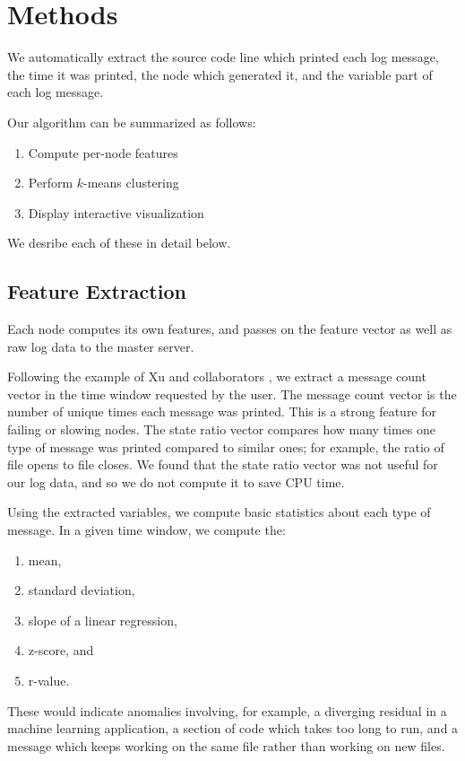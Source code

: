 \documentclass[conference]{style/acmsiggraph}
\begin{document}
\section{Methods}

We automatically extract the source code line which printed each log message, the time it was printed, the node which generated it, and the variable part of each log message.

Our algorithm can be summarized as follows:

\begin{enumerate}
    \item Compute per-node features
    \item Perform $k$-means clustering
    \item Display interactive visualization
\end{enumerate}

We desribe each of these in detail below.

\subsection{Feature Extraction}
Each node computes its own features, and passes on the feature vector as well as raw log data to the master server.

Following the example of Xu and collaborators \cite{Xu09}, we extract a message count vector in the time window requested by the user.
The message count vector is the number of unique times each message was printed.
This is a strong feature for failing or slowing nodes.
The state ratio vector compares how many times one type of message was printed compared to similar ones; for example, the ratio of file opens to file closes.
We found that the state ratio vector was not useful for our log data, and so we do not compute it to save CPU time.

Using the extracted variables, we compute basic statistics about each type of message.
In a given time window, we compute the:
\begin{enumerate}
\item mean,
\item standard deviation,
\item slope of a linear regression,
\item z-score, and
\item r-value.
\end{enumerate}
These would indicate anomalies involving, for example, a diverging residual in a machine learning application, a section of code which takes too long to run, and a message which keeps working on the same file rather than working on new files.
\end{document}
